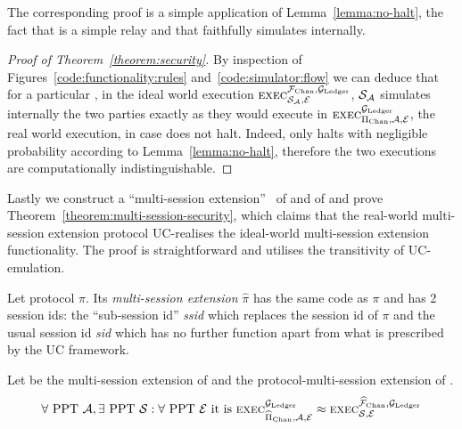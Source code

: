   The corresponding proof is a simple application of
  Lemma~\ref{lemma:no-halt}, the fact that \fchan is a simple relay and that
  \simulator faithfully simulates \pchan internally.

\begin{proof}[Proof of Theorem~\ref{theorem:security}]
  By inspection of Figures~\ref{code:functionality:rules}
  and~\ref{code:simulator:flow} we can deduce that for a particular
  \environment, in the ideal world execution $\textsc{exec}^{\mathcal{F}_{\mathrm{Chan}},
  \mathcal{G}_{\mathrm{Ledger}}}_{\mathcal{S}_{\mathcal{A}}, \mathcal{E}}$, $\mathcal{S}_{\mathcal{A}}$
  simulates internally the two \pchan parties exactly as they would execute in
  $\textsc{exec}^{\mathcal{G}_{\mathrm{Ledger}}}_{\Pi_{\mathrm{Chan}}, \mathcal{A}, \mathcal{E}}$, the real world
  execution, in case \fchan does not halt. Indeed, \fchan only halts with
  negligible probability according to Lemma~\ref{lemma:no-halt}, therefore the
  two executions are computationally indistinguishable.
\end{proof}

  Lastly we construct a ``multi-session
  extension''~\cite{DBLP:conf/crypto/CanettiR03} of \fchan and of \pchan and
  prove Theorem~\ref{theorem:multi-session-security}, which claims that the
  real-world multi-session extension protocol UC-realises the ideal-world
  multi-session extension functionality. The proof is straightforward and
  utilises the transitivity of UC-emulation.

\begin{definition}
  Let protocol $\pi$. Its \emph{multi-session extension} $\hat{\pi}$ has the
  same code as $\pi$ and has 2 session ids: the ``sub-session id''
  \emph{ssid} which replaces the session id of $\pi$ and the usual session id
  \emph{sid} which has no further function apart from what is prescribed by the
  UC framework.
\end{definition}

\begin{theorem}
  \label{theorem:multi-session-security}
  Let \fchanhat be the multi-session extension of \fchan and \pchanhat the
  protocol-multi-session extension of \pchan.
  \begin{gather*}
    \forall \text{ PPT } \mathcal{A}, \exists \text{
    PPT } \mathcal{S}: \forall \text{ PPT } \mathcal{E} \text{ it is }
    \textsc{exec}^{\mathcal{G}_{\mathrm{Ledger}}}_{\widehat{\Pi}_{\mathrm{Chan}}, \mathcal{A}, \mathcal{E}} \approx
    \textsc{exec}^{\widehat{\mathcal{F}}_{\mathrm{Chan}}, \mathcal{G}_{\mathrm{Ledger}}}_{\mathcal{S}, \mathcal{E}}
  \end{gather*}
\end{theorem}

